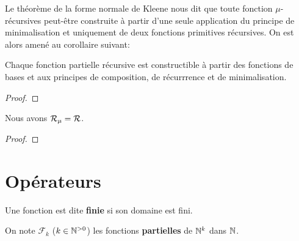 Le théorème de la forme normale de Kleene nous dit que toute fonction
$\mu$-récursives peut-être construite à partir d'une seule application du
principe de minimalisation et uniquement de deux fonctions primitives
récursives. On est alors amené au corollaire suivant:

\begin{corollary}
	Chaque fonction partielle récursive est constructible à partir des fonctions de bases
	et aux principes de composition, de récurrrence et de minimalisation.
\end{corollary}

\ifdefined\outputproof
\begin{proof}

\end{proof}
\fi

\begin{theorem}
	Nous avons $\mathcal{R}_{\mu} = \mathcal{R}$.
\end{theorem}

\ifdefined\outputproof
\begin{proof}

\end{proof}
\fi

\section{Opérateurs}




\begin{definition} 
	Une fonction est dite \textbf{finie} si son domaine est fini.
\end{definition}

\begin{notation}
	On note $\mathcal{F}_{k}$ ($k \in \mathbb{N}^{> 0}$) les fonctions
	\textbf{partielles} de $\mathbb{N}^{k}$ dans $\mathbb{N}$.
\end{notation}

